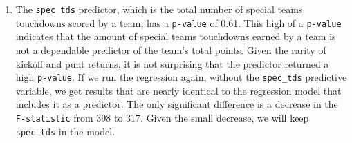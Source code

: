 \documentclass[
  letterpaper,
]{krantz}
\newenvironment{Shaded}{\begin{snugshade}}{\end{snugshade}}
\newcommand{\DecValTok}[1]{\textcolor[rgb]{0.68,0.00,0.00}{#1}}
\newcommand{\FunctionTok}[1]{\textcolor[rgb]{0.28,0.35,0.67}{#1}}
\newcommand{\NormalTok}[1]{\textcolor[rgb]{0.00,0.23,0.31}{#1}}
\newcommand{\OtherTok}[1]{\textcolor[rgb]{0.00,0.23,0.31}{#1}}
\newcommand{\SpecialCharTok}[1]{\textcolor[rgb]{0.37,0.37,0.37}{#1}}
\providecommand{\tightlist}{%
  \setlength{\itemsep}{0pt}\setlength{\parskip}{0pt}}\usepackage{longtable,booktabs,array}
\begin{document}
\begin{tcolorbox}[enhanced jigsaw, colback=white, leftrule=.75mm, breakable, colframe=quarto-callout-tip-color-frame, bottomtitle=1mm, rightrule=.15mm, left=2mm, opacityback=0, bottomrule=.15mm, arc=.35mm, coltitle=black, colbacktitle=quarto-callout-tip-color!10!white, toptitle=1mm, titlerule=0mm, title=\textcolor{quarto-callout-tip-color}{\faLightbulb}\hspace{0.5em}{Tip}, toprule=.15mm, opacitybacktitle=0.6]

\begin{Shaded}
\end{Shaded}

\end{tcolorbox}

\begin{enumerate}
\def\labelenumi{\arabic{enumi}.}
\setcounter{enumi}{1}
\tightlist
\item
  The \texttt{spec\_tds} predictor, which is the total number of special
  teams touchdowns scored by a team, has a \texttt{p-value} of 0.61.
  This high of a \texttt{p-value} indicates that the amount of special
  teams touchdowns earned by a team is not a dependable predictor of the
  team's total points. Given the rarity of kickoff and punt returns, it
  is not surprising that the predictor returned a high \texttt{p-value}.
  If we run the regression again, without the \texttt{spec\_tds}
  predictive variable, we get results that are nearly identical to the
  regression model that includes it as a predictor. The only significant
  difference is a decrease in the \texttt{F-statistic} from 398 to 317.
  Given the small decrease, we will keep \texttt{spec\_tds} in the
  model.
\end{enumerate}
\end{document}
